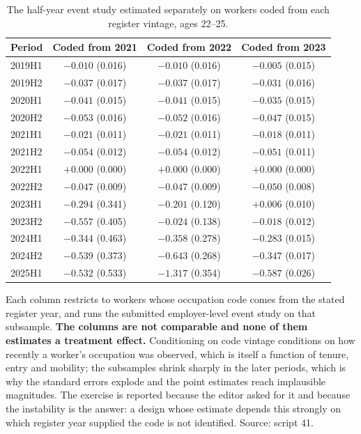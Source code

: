\begin{table}[ht!]
\centering
\footnotesize
\caption{The half-year event study estimated separately on workers coded from each register vintage, ages 22--25.}
\label{tab:iv_vintage}
\begin{tabular}{lccc}
\toprule
Period & Coded from 2021 & Coded from 2022 & Coded from 2023 \\
\midrule
2019H1 & $-0.010$ (0.016) & $-0.010$ (0.016) & $-0.005$ (0.015) \\
2019H2 & $-0.037$ (0.017) & $-0.037$ (0.017) & $-0.031$ (0.016) \\
2020H1 & $-0.041$ (0.015) & $-0.041$ (0.015) & $-0.035$ (0.015) \\
2020H2 & $-0.053$ (0.016) & $-0.052$ (0.016) & $-0.047$ (0.015) \\
2021H1 & $-0.021$ (0.011) & $-0.021$ (0.011) & $-0.018$ (0.011) \\
2021H2 & $-0.054$ (0.012) & $-0.054$ (0.012) & $-0.051$ (0.011) \\
2022H1 & $+0.000$ (0.000) & $+0.000$ (0.000) & $+0.000$ (0.000) \\
2022H2 & $-0.047$ (0.009) & $-0.047$ (0.009) & $-0.050$ (0.008) \\
2023H1 & $-0.294$ (0.341) & $-0.201$ (0.120) & $+0.006$ (0.010) \\
2023H2 & $-0.557$ (0.405) & $-0.024$ (0.138) & $-0.018$ (0.012) \\
2024H1 & $-0.344$ (0.463) & $-0.358$ (0.278) & $-0.283$ (0.015) \\
2024H2 & $-0.539$ (0.373) & $-0.643$ (0.268) & $-0.347$ (0.017) \\
2025H1 & $-0.532$ (0.533) & $-1.317$ (0.354) & $-0.587$ (0.026) \\
\bottomrule
\end{tabular}
\begin{minipage}{0.90\textwidth}\footnotesize\vspace{4pt}Each column restricts to workers whose occupation code comes from the stated register year, and runs the submitted employer-level event study on that subsample. \textbf{The columns are not comparable and none of them estimates a treatment effect.} Conditioning on code vintage conditions on how recently a worker's occupation was observed, which is itself a function of tenure, entry and mobility; the subsamples shrink sharply in the later periods, which is why the standard errors explode and the point estimates reach implausible magnitudes. The exercise is reported because the editor asked for it and because the instability is the answer: a design whose estimate depends this strongly on which register year supplied the code is not identified. Source: script 41.\end{minipage}
\end{table}
